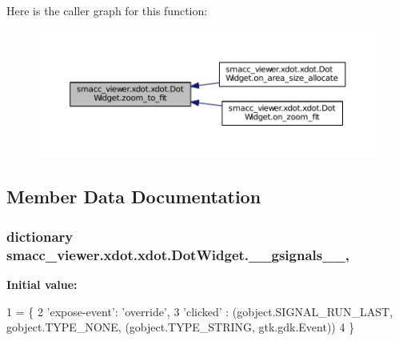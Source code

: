 Here is the caller graph for this function\+:
\nopagebreak
\begin{figure}[H]
\begin{center}
\leavevmode
\includegraphics[width=350pt]{classsmacc__viewer_1_1xdot_1_1xdot_1_1DotWidget_a52852977b8266649f643aabe89b5355e_icgraph}
\end{center}
\end{figure}




\subsection{Member Data Documentation}
\subsubsection[{\texorpdfstring{\+\_\+\+\_\+gsignals\+\_\+\+\_\+}{__gsignals__}}]{\setlength{\rightskip}{0pt plus 5cm}dictionary smacc\+\_\+viewer.\+xdot.\+xdot.\+Dot\+Widget.\+\_\+\+\_\+gsignals\+\_\+\+\_\+\hspace{0.3cm}{\ttfamily [static]}, {\ttfamily [private]}}\hypertarget{classsmacc__viewer_1_1xdot_1_1xdot_1_1DotWidget_acef661de0111eae10dd92d82ea229cfd}{}\label{classsmacc__viewer_1_1xdot_1_1xdot_1_1DotWidget_acef661de0111eae10dd92d82ea229cfd}
{\bfseries Initial value\+:}
\begin{DoxyCode}
1 = \{
2         \textcolor{stringliteral}{'expose-event'}: \textcolor{stringliteral}{'override'},
3         \textcolor{stringliteral}{'clicked'} : (gobject.SIGNAL\_RUN\_LAST, gobject.TYPE\_NONE, (gobject.TYPE\_STRING, gtk.gdk.Event))
4     \}
\end{DoxyCode}


